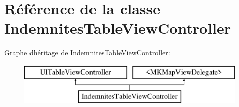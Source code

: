 \hypertarget{interface_indemnites_table_view_controller}{}\section{Référence de la classe Indemnites\+Table\+View\+Controller}
\label{interface_indemnites_table_view_controller}
Graphe d\textquotesingle{}héritage de Indemnites\+Table\+View\+Controller\+:\begin{figure}[H]
\begin{center}
\leavevmode
\includegraphics[height=2.000000cm]{interface_indemnites_table_view_controller}
\end{center}
\end{figure}

